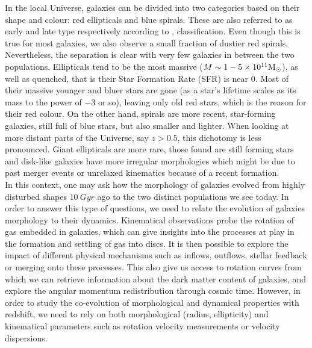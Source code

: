 In the local Universe, galaxies can be divided into two categories based on their shape and colour: red ellipticals and blue spirals. These are also referred to as early and late type respectively according to ,   classification. Even though this is true for most galaxies, we also observe a small fraction of dustier red spirals. Nevertheless, the separation is clear with very few galaxies in between the two populations. Ellipticals tend to be the most massive ($M \sim 1-5 \times 10^{11} \rm{M_\odot}$), as well as quenched, that is their Star Formation Rate (SFR) is near $0$. Most of their massive younger and bluer stars are gone (as a star's lifetime scales as its mass to the power of $-3$ or so), leaving only old red stars, which is the reason for their red colour. On the other hand, spirals are more recent, star-forming galaxies, still full of blue stars, but also smaller and lighter.
When looking at more distant parts of the Universe, say $z > 0.5$, this dichotomy is less pronounced. Giant ellipticals are more rare, those found are still forming stars and disk-like galaxies have more irregular morphologies which might be due to past merger events or unrelaxed kinematics because of a recent formation.\\

In this context, one may ask how the morphology of galaxies evolved from highly disturbed shapes $\SI{10}{Gyr}$ ago to the two distinct populations we see today. In order to answer this type of questions, we need to relate the evolution of galaxies morphology to their dynamics. Kinematical observations probe the rotation of gas embedded in  galaxies, which can give insights into the processes at play in the formation and settling of gas into discs. It is then possible to explore the impact of different physical mechanisms such as inflows, outflows, stellar feedback or merging onto these processes. This also give us access to rotation curves from which we can retrieve information about the dark matter content of galaxies, and explore the angular momentum redistribution through cosmic time. However, in order to study the co-evolution of morphological and dynamical properties with redshift, we need to rely on both morphological (radius, ellipticity) and kinematical parameters such as rotation velocity measurements or velocity dispersions. \\


